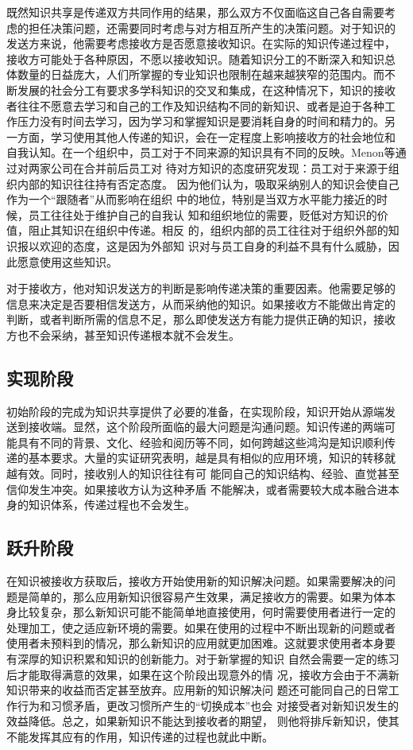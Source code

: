 \documentclass[12pt,a4paper]{ctexart}
\begin{document}
既然知识共享是传递双方共同作用的结果，那么双方不仅面临这自己各自需要考
虑的担任决策问题，还需要同时考虑与对方相互所产生的决策问题。对于知识的
发送方来说，他需要考虑接收方是否愿意接收知识。在实际的知识传递过程中，
接收方可能处于各种原因，不愿以接收知识。随着知识分工的不断深入和知识总
体数量的日益庞大，人们所掌握的专业知识也限制在越来越狭窄的范围内。而不
断发展的社会分工有要求多学科知识的交叉和集成，在这种情况下，知识的接收
者往往不愿意去学习和自己的工作及知识结构不同的新知识、或者是迫于各种工
作压力没有时间去学习，因为学习和掌握知识是要消耗自身的时间和精力的。另
一方面，学习使用其他人传递的知识，会在一定程度上影响接收方的社会地位和
自我认知。在一个组织中，员工对于不同来源的知识具有不同的反映。Menon等\cite{2203456620060801}通过对两家公司在合并前后员工对
待对方知识的态度研究发现：员工对于来源于组织内部的知识往往持有否定态度。
因为他们认为，吸取采纳别人的知识会使自己作为一个“跟随者”从而影响在组织
中的地位，特别是当双方水平能力接近的时候，员工往往处于维护自己的自我认
知和组织地位的需要，贬低对方知识的价值，阻止其知识在组织中传递。相反
的，组织内部的员工往往对于组织外部的知识报以欢迎的态度，这是因为外部知
识对与员工自身的利益不具有什么威胁，因此愿意使用这些知识。

对于接收方，他对知识发送方的判断是影响传递决策的重要因素。他需要足够的
信息来决定是否要相信发送方，从而采纳他的知识。如果接收方不能做出肯定的
判断，或者判断所需的信息不足，那么即使发送方有能力提供正确的知识，接收
方也不会采纳，甚至知识传递根本就不会发生。

\subsection{实现阶段}
初始阶段的完成为知识共享提供了必要的准备，在实现阶段，知识开始从源端发
送到接收端。显然，这个阶段所面临的最大问题是沟通问题。知识传递的两端可
能具有不同的背景、文化、经验和阅历等不同，如何跨越这些鸿沟是知识顺利传
递的基本要求。大量的实证研究表明，越是具有相似的应用环境，知识的转移就
越有效。同时，接收别人的知识往往有可
能同自己的知识结构、经验、直觉甚至信仰发生冲突。如果接收方认为这种矛盾
不能解决，或者需要较大成本融合进本身的知识体系，传递过程也不会发生。


\subsection{跃升阶段}

在知识被接收方获取后，接收方开始使用新的知识解决问题。如果需要解决的问
题是简单的，那么应用新知识很容易产生效果，满足接收方的需要。如果为体本
身比较复杂，那么新知识可能不能简单地直接使用，何时需要使用者进行一定的
处理加工，使之适应新环境的需要。如果在使用的过程中不断出现新的问题或者
使用者未预料到的情况，那么新知识的应用就更加困难。这就要求使用者本身要
有深厚的知识积累和知识的创新能力。对于新掌握的知识
自然会需要一定的练习后才能取得满意的效果，如果在这个阶段出现意外的情
况，接收方会由于不满新知识带来的收益而否定甚至放弃。应用新的知识解决问
题还可能同自己的日常工作行为和习惯矛盾，更改习惯所产生的“切换成本”也会
对接受者对新知识发生的效益降低。总之，如果新知识不能达到接收者的期望，
则他将排斥新知识，使其不能发挥其应有的作用，知识传递的过程也就此中断。
\end{document}
